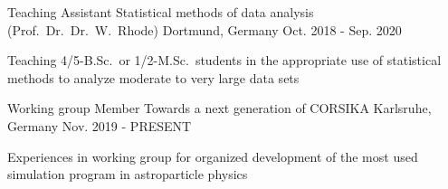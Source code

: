 \documentclass[11pt, a4paper]{Awesome-CV/awesome-cv}
\begin{document}
\begin{cventries}

    \cventry
    {Teaching Assistant} %
    {Statistical methods of data analysis (Prof.~Dr.~Dr.~W.~Rhode)} %
    {Dortmund, Germany} %
    {Oct. 2018 - Sep. 2020} %
    {
        \begin{cvitems} %
        \item {Teaching 4/5-B.Sc.\ or 1/2-M.Sc.~students in the appropriate use of statistical methods to analyze moderate to very large data sets}
        \end{cvitems}
    }

    \cventry
    {Working group Member} %
    {Towards a next generation of CORSIKA} %
    {Karlsruhe, Germany} %
    {Nov. 2019 - PRESENT} %
    {
        \begin{cvitems} %
        \item {Experiences in working group for organized development of the most used simulation program in astroparticle physics}
        \end{cvitems}
    }

\end{cventries}

\end{document}
